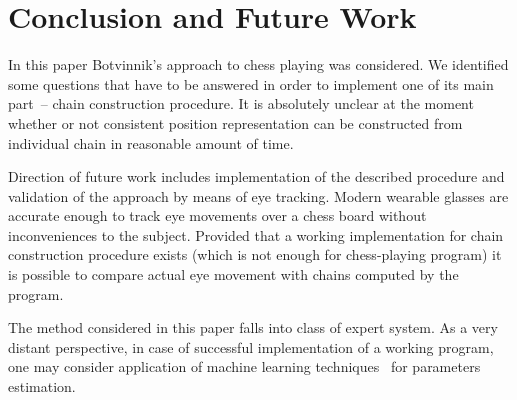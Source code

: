 \documentclass{llncs}
\begin{document}
\section{Conclusion and Future Work}
In this paper Botvinnik's approach to chess playing was considered. We
identified some questions that have to be answered in order to
implement one of its main part~-- chain construction procedure. It is
absolutely unclear at the moment whether or not consistent position
representation can be constructed from individual chain in reasonable
amount of time.

Direction of future work includes implementation of the described
procedure and validation of the approach by means of eye
tracking. Modern wearable glasses are accurate enough to track eye
movements over a chess board without inconveniences to the
subject. Provided that a working implementation for chain construction
procedure exists (which is not enough for chess-playing program) it is
possible to compare actual eye movement with chains computed by the
program.

The method considered in this paper falls into class of expert
system. As a very distant perspective, in case of successful
implementation of a working program, one may consider application of
machine learning
techniques~\cite{Fogel:2004:self-learning,Wirth:2015:on-learning} for
parameters estimation.


{\small
}
\end{document}
